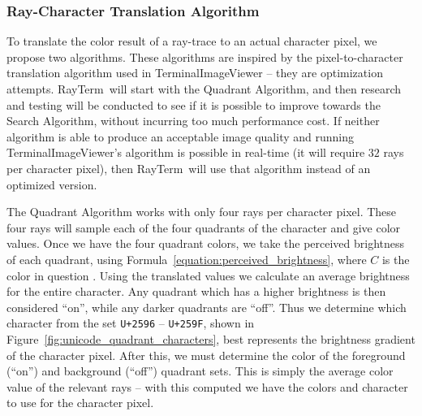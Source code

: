 \documentclass[11pt]{article}
\def\widow#1{\vskip #1\vbadness10000\penalty-200\vskip-#1}
\def\littlesection#1{
  \widow{2cm}
  \vskip 0.5cm
  \noindent{\bf #1}
  \vskip 0.0001cm
}
\newcommand{\name}{{\sc RayTerm}}
\begin{document}
%

\subsubsection{Ray-Character Translation Algorithm}
\label{sec:method:ray_character_algorithm}

To translate the color result of a ray-trace to an actual character pixel, we propose two algorithms.
These algorithms are inspired by the pixel-to-character translation algorithm used in TerminalImageViewer \cite{tivGithub} -- they are optimization attempts.
\name\ will start with the Quadrant Algorithm, and then research and testing will be conducted to see if it is possible to improve towards the Search Algorithm, without incurring too much performance cost.
If neither algorithm is able to produce an acceptable image quality and running TerminalImageViewer's algorithm is possible in real-time (it will require $32$ rays per character pixel), then \name\ will use that algorithm instead of an optimized version.


\littlesection{Quadrant Algorithm}

The Quadrant Algorithm works with only four rays per character pixel.
These four rays will sample each of the four quadrants of the character and give color values.
Once we have the four quadrant colors, we take the perceived brightness of each quadrant, using Formula~\ref{equation:perceived_brightness}, where $C$ is the color in question \cite{finley2006hsp}.
Using the translated values we calculate an average brightness for the entire character.
Any quadrant which has a higher brightness is then considered ``on'', while any darker quadrants are ``off''.
Thus we determine which character from the set \texttt{U+2596} -- \texttt{U+259F}, shown in Figure~\ref{fig:unicode_quadrant_characters}, best represents the brightness gradient of the character pixel.
After this, we must determine the color of the foreground (``on'') and background (``off'') quadrant sets.
This is simply the average color value of the relevant rays -- with this computed we have the colors and character to use for the character pixel.
\end{document}
